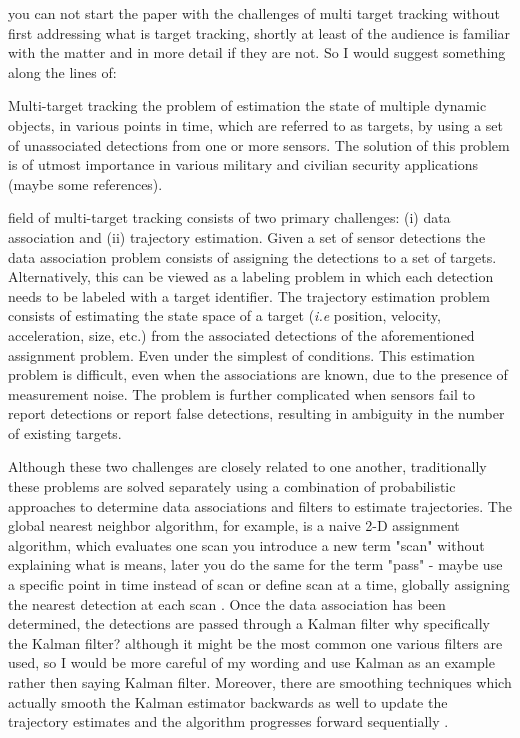 \documentclass[journal]{IEEEtran}
\begin{document}
{\color{red} you can not start the paper with the challenges of multi target tracking without first addressing what is target tracking, shortly at least of the audience is familiar with the matter and in more detail if they are not. So I would suggest something along the lines of:

Multi-target tracking the problem of estimation the state of multiple dynamic objects, in various points in time, which are referred to as targets, by using a set of unassociated detections from one or more sensors. The solution of this problem is of utmost importance in various military and civilian security applications (maybe some references).}
 field of multi-target tracking consists of two primary challenges: (i) data association and (ii) trajectory estimation.  Given a set of sensor detections the data association problem consists of assigning the detections to a set of targets. Alternatively, this can be viewed as a labeling problem in which {\color{red} each detection needs to be labeled with a target identifier}.  The trajectory estimation problem consists of estimating the state space of a target (\textit{i.e} position, velocity, acceleration, size, etc.) from the associated detections of the aforementioned assignment problem. Even under the simplest of conditions. This {\color{red} estimation} problem is difficult, even when the associations are known, due to the presence of measurement noise. The problem is further complicated when sensors  fail to report detections or report false detections, resulting in ambiguity in the number of existing targets. 

Although these two challenges are closely related to one another, traditionally these problems are solved separately using a combination of probabilistic approaches to determine data associations and filters to estimate trajectories. The global nearest neighbor algorithm, for example, is a naive 2-D assignment algorithm, which evaluates one scan {\color{red} you introduce a new term "scan" without explaining what is means, later you do the same for the term "pass" - maybe use a specific point in time instead of scan or define scan} at a time, globally assigning the nearest detection at each scan \cite{GNN}. Once the data association has been determined, the detections are passed through a Kalman filter {\color{red} why specifically the Kalman filter? although it might be the most common one various filters are used, so I would be more careful of my wording and use Kalman as an example rather then saying Kalman filter. Moreover, there are smoothing techniques which actually smooth the Kalman estimator backwards as well} to update the trajectory estimates and the algorithm progresses forward sequentially \cite{Kalman}.
\end{document}
